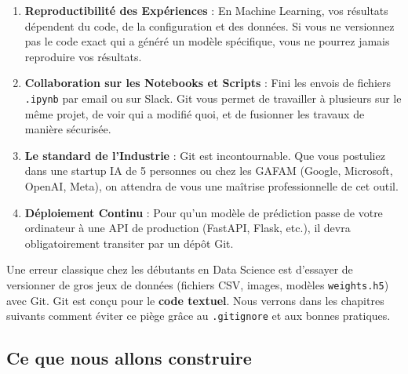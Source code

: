 \documentclass[
  letterpaper,
  DIV=11,
  numbers=noendperiod]{scrreprt}
\providecommand{\tightlist}{%
  \setlength{\itemsep}{0pt}\setlength{\parskip}{0pt}}
\begin{document}
\begin{enumerate}
\def\labelenumi{\arabic{enumi}.}
\tightlist
\item
  \textbf{Reproductibilité des Expériences} : En Machine Learning, vos
  résultats dépendent du code, de la configuration et des données. Si
  vous ne versionnez pas le code exact qui a généré un modèle
  spécifique, vous ne pourrez jamais reproduire vos résultats.
\item
  \textbf{Collaboration sur les Notebooks et Scripts} : Fini les envois
  de fichiers \texttt{.ipynb} par email ou sur Slack. Git vous permet de
  travailler à plusieurs sur le même projet, de voir qui a modifié quoi,
  et de fusionner les travaux de manière sécurisée.
\item
  \textbf{Le standard de l'Industrie} : Git est incontournable. Que vous
  postuliez dans une startup IA de 5 personnes ou chez les GAFAM
  (Google, Microsoft, OpenAI, Meta), on attendra de vous une maîtrise
  professionnelle de cet outil.
\item
  \textbf{Déploiement Continu} : Pour qu'un modèle de prédiction passe
  de votre ordinateur à une API de production (FastAPI, Flask, etc.), il
  devra obligatoirement transiter par un dépôt Git.
\end{enumerate}

\begin{tcolorbox}[enhanced jigsaw, arc=.35mm, bottomrule=.15mm, bottomtitle=1mm, breakable, colback=white, colbacktitle=quarto-callout-important-color!10!white, colframe=quarto-callout-important-color-frame, coltitle=black, left=2mm, leftrule=.75mm, opacityback=0, opacitybacktitle=0.6, rightrule=.15mm, title=\textcolor{quarto-callout-important-color}{\faExclamation}\hspace{0.5em}{Attention aux Données !}, titlerule=0mm, toprule=.15mm, toptitle=1mm]

Une erreur classique chez les débutants en Data Science est d'essayer de
versionner de gros jeux de données (fichiers CSV, images, modèles
\texttt{weights.h5}) avec Git. Git est conçu pour le \textbf{code
textuel}. Nous verrons dans les chapitres suivants comment éviter ce
piège grâce au \texttt{.gitignore} et aux bonnes pratiques.

\end{tcolorbox}

\subsection{Ce que nous allons
construire}\label{ce-que-nous-allons-construire}
\end{document}
